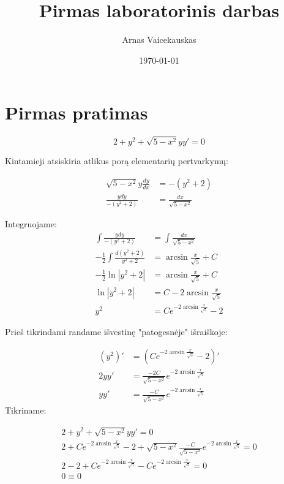 \documentclass[11pt]{article}
\title{ Pirmas laboratorinis darbas}
\author{ Arnas Vaicekauskas }
\date{\today}
\begin{document}
\maketitle

\section{Pirmas pratimas}

\setlength{\jot}{10px}

$$
2+y^2+\sqrt{5-x^2}yy'=0
$$

Kintamieji atsiskiria atlikus porą elementarių pertvarkymų:

\begin{equation}
\begin{split}
\sqrt{5-x^2}y\frac{dy}{dx}&=-(y^2+2) \\
\frac{ydy}{-(y^2+2)}&=\frac{dx}{\sqrt{5-x^2}}
\end{split}
\end{equation}

Integruojame:
\begin{equation}
    \begin{split}
        \int\frac{ydy}{-(y^2+2)}&=\int\frac{dx}{\sqrt{5-x^2}} \\
        -\frac{1}{2}\int\frac{d(y^2+2)}{y^2+2}&=\arcsin{\frac{x}{\sqrt{5}}}+C\\
        -\frac{1}{2}\ln|y^2+2|&=\arcsin{\frac{x}{\sqrt{5}}}+C\\
        \ln|y^2+2|&=C-2\arcsin{\frac{x}{\sqrt{5}}}\\
        y^2&=Ce^{-2\arcsin{\frac{x}{\sqrt{5}}}} - 2
    \end{split}
\end{equation}

Prieš tikrindami randame išvestinę "patogesnėje" išraiškoje:

\begin{equation}
    \begin{split}
        (y^2)'&=(Ce^{-2\arcsin{\frac{x}{\sqrt{5}}}} - 2)' \\
        2yy'&=\frac{-2C}{\sqrt{5-x^2}}e^{-2\arcsin{\frac{x}{\sqrt{5}}}}\\
        yy'&=\frac{-C}{\sqrt{5-x^2}}e^{-2\arcsin{\frac{x}{\sqrt{5}}}}
    \end{split}
\end{equation}
\newpage
Tikriname:

\begin{equation}
    \begin{split}
        2+y^2+\sqrt{5-x^2}yy'=0\\
        2+Ce^{-2\arcsin{\frac{x}{\sqrt{5}}}} - 2+\sqrt{5-x^2}\frac{-C}{\sqrt{5-x^2}}e^{-2\arcsin{\frac{x}{\sqrt{5}}}}=0\\
        2-2+Ce^{-2\arcsin{\frac{x}{\sqrt{5}}}}-Ce^{-2\arcsin{\frac{x}{\sqrt{5}}}}=0\\
        0\equiv0
    \end{split}
\end{equation}
\end{document}
